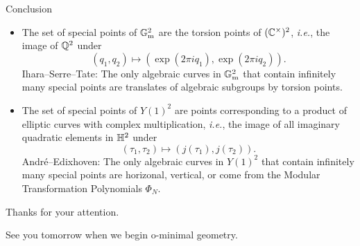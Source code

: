 \documentclass{beamer}
\begin{document}
\begin{frame}{Conclusion}

  \begin{itemize}
  \item The set of special points of ${\mathbb{G}}_{\mathrm{m}}^2$ are the
    torsion points of $({\mathbb{C}}^\times)^2$, \textit{i.e.},  the image
    of ${\mathbb{Q}}^2$ under $$(q_1,q_2)\mapsto (\exp(2\pi i
    q_1),\exp(2\pi iq_2)).$$ 
    Ihara--Serre--Tate: The only algebraic curves in ${\mathbb{G}}_{\mathrm{m}}^2$ that
    contain infinitely many special points are translates of algebraic
    subgroups by torsion points.

  \item The set of special points of $Y(1)^2$ are points corresponding
    to a product of elliptic curves with complex multiplication,
    \textit{i.e.}, the image of all imaginary quadratic elements in
    ${\mathbb{H}}^2$ under
    $$ (\tau_1,\tau_2) \mapsto (j(\tau_1),j(\tau_2)).$$
    Andr\'e--Edixhoven: The only algebraic curves in $Y(1)^2$ that
    contain infinitely many special points are horizonal, vertical, or
    come from the Modular Transformation Polynomials $\Phi_N$. 
  \end{itemize}
\end{frame}

\begin{frame}
  \begin{center}
    Thanks for your attention.

    See you tomorrow when we begin o-minimal geometry.
  \end{center}
\end{frame}
\end{document}
